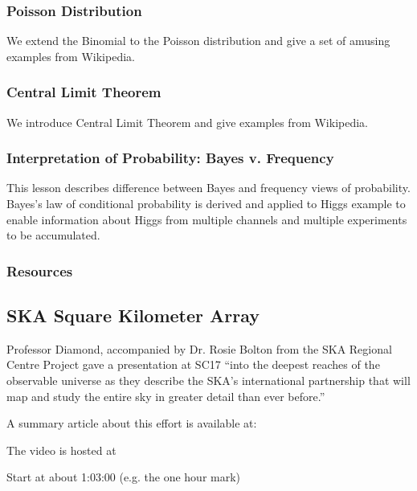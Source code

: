 \subsubsection{Poisson Distribution}\label{poisson-distribution}

We extend the Binomial to the Poisson distribution and give a set of
amusing examples from Wikipedia.


\subsubsection{Central Limit Theorem}\label{central-limit-theorem}

We introduce Central Limit Theorem and give examples from Wikipedia.


\subsubsection{Interpretation of Probability: Bayes v.
Frequency}\label{interpretation-of-probability-bayes-v.-frequency}

This lesson describes difference between Bayes and frequency views of
probability. Bayes's law of conditional probability is derived and
applied to Higgs example to enable information about Higgs from multiple
channels and multiple experiments to be accumulated.


\subsubsection{Resources}\label{resources-3}


\subsection{SKA Square Kilometer Array}


Professor Diamond, accompanied by Dr. Rosie Bolton from the SKA
Regional Centre Project gave a presentation at SC17 ``into the deepest
reaches of the observable universe as they describe the SKA’s
international partnership that will map and study the entire sky in
greater detail than ever before.''


A summary article about this effort is available at:


The video is hosted at 


Start at about 1:03:00 (e.g. the one hour mark)